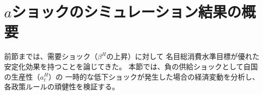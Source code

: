 \section{\(a\)ショックのシミュレーション結果の概要}
\label{sec:chapter5_a_shock_overview}
前節までは、需要ショック（\(\beta^H\)の上昇）に対して
名目総消費水準目標が優れた安定化効果を持つことを論じてきた。
本節では、負の供給ショックとして自国の生産性（\(a_t^H\)）の
一時的な低下ショックが発生した場合の経済変動を分析し、各政策ルールの頑健性を検証する。